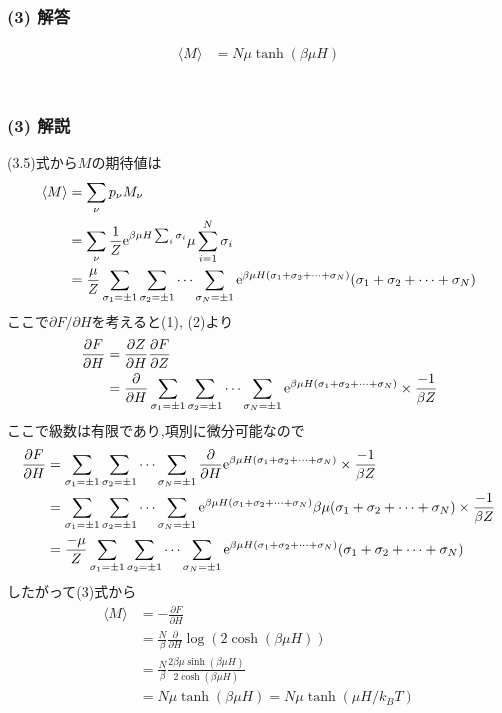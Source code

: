 \documentclass[uplatex,a4j,11pt,dvipdfmx]{jsarticle}
\begin{document}
\subsubsection*{(3) 解答}
\begin{align*}
  \langle M\rangle&=N\mu\tanh(\beta\mu H)\\
\end{align*}
\dotfill\\
\subsubsection*{(3) 解説}
(3.5)式から$M$の期待値は
\begin{align*}
  \langle M\rangle&=\sum_\nu p_\nu M_\nu\\
  &=\sum_\nu \frac{1}{Z}{\rm e}^{\beta\mu H\sum_i\sigma_i}\mu\sum_{i=1}^N \sigma_i\\
  &=\frac{\mu}{Z}\sum_{\sigma_1=\pm1}\sum_{\sigma_2=\pm1}\cdots\sum_{\sigma_N=\pm1}{\rm e}^{\beta\mu H(\sigma_1+\sigma_2+\cdots+\sigma_N)}(\sigma_1+\sigma_2+\cdots+\sigma_N)
\end{align*}
ここで$\partial F/\partial H$を考えると(1), (2)より
\begin{align*}
  \frac{\partial F}{\partial H}&=\frac{\partial Z}{\partial H}\frac{\partial F}{\partial Z}\\
  &=\frac{\partial}{\partial H}\sum_{\sigma_1=\pm1}\sum_{\sigma_2=\pm1}\cdots\sum_{\sigma_N=\pm1}{\rm e}^{\beta\mu H(\sigma_1+\sigma_2+\cdots+\sigma_N)}\times\frac{-1}{\beta Z}\\
\end{align*}
ここで級数は有限であり,項別に微分可能なので
\begin{align*}
  \frac{\partial F}{\partial H}&=\sum_{\sigma_1=\pm1}\sum_{\sigma_2=\pm1}\cdots\sum_{\sigma_N=\pm1}\frac{\partial}{\partial H}{\rm e}^{\beta\mu H(\sigma_1+\sigma_2+\cdots+\sigma_N)}\times\frac{-1}{\beta Z}\\
  &=\sum_{\sigma_1=\pm1}\sum_{\sigma_2=\pm1}\cdots\sum_{\sigma_N=\pm1}{\rm e}^{\beta\mu H(\sigma_1+\sigma_2+\cdots+\sigma_N)}\beta\mu(\sigma_1+\sigma_2+\cdots+\sigma_N)\times\frac{-1}{\beta Z}\\
  &=\frac{-\mu}{Z}\sum_{\sigma_1=\pm1}\sum_{\sigma_2=\pm1}\cdots\sum_{\sigma_N=\pm1}{\rm e}^{\beta\mu H(\sigma_1+\sigma_2+\cdots+\sigma_N)}(\sigma_1+\sigma_2+\cdots+\sigma_N)
\end{align*}
したがって(3)式から
\begin{align}
  \langle M\rangle&=-\frac{\partial F}{\partial H}\nonumber\\
  &=\frac{N}{\beta}\frac{\partial}{\partial H}\log(2\cosh(\beta\mu H))\nonumber\\
  &=\frac{N}{\beta}\frac{2\beta\mu\sinh(\beta\mu H)}{2\cosh(\beta\mu H)}\nonumber\\
  &=N\mu\tanh(\beta\mu H)=N\mu\tanh(\mu H/k_BT)
\end{align}
\clearpage
\appendix
\end{document}

